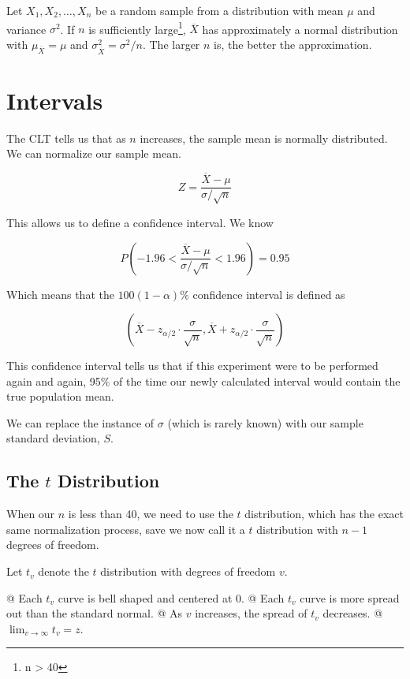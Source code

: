 Let $X_1, X_2, \ldots, X_n$ be a random sample from a distribution with mean $\mu$ and variance $\sigma^2$. If $n$ is
sufficiently large\footnote{n > 40}, $\overline{X}$ has approximately a normal distribution with $\mu_{\overline{X} } = \mu$ and
$\sigma^2_{\overline{X} } = \sigma^2 / n$. The larger $n$ is, the better the approximation.

\section{Intervals}
The CLT tells us that as $n$ increases, the sample mean is normally distributed. We can normalize our sample mean.

\[
    Z = \frac{\overline{X} - \mu}{\sigma / \sqrt{n} }
\]

This allows us to define a confidence interval. We know 

\[
    P \left( -1.96 < \frac{\overline{X} - \mu}{\sigma / \sqrt{n} } < 1.96 \right) = 0.95
\]

Which means that the $100 ( 1 - \alpha)\%$ confidence interval is defined as

\[
    \left(
    \overline{X} - z_{\alpha/2} \cdot \frac{\sigma}{\sqrt{n} },
    \overline{X} + z_{\alpha/2} \cdot \frac{\sigma}{\sqrt{n} }
    \right)
\]

This confidence interval tells us that if this experiment were to be performed again and again, 95\% of the time our
newly calculated interval would contain the true population mean.

We can replace the instance of $\sigma$ (which is rarely known) with our sample standard deviation, $S$.

    \subsection{The $t$ Distribution}
    When our $n$ is less than 40, we need to use the $t$ distribution, which has the exact same normalization process,
    save we now call it a $t$ distribution with $n - 1$ degrees of freedom.

    Let $t_v$ denote the $t$ distribution with degrees of freedom $v$.

    \NewList
    \begin{easylist}
        @ Each $t_v$ curve is bell shaped and centered at 0.
        @ Each $t_v$ curve is more spread out than the standard normal.
        @ As $v$ increases, the spread of $t_v$ decreases.
        @ $ \lim_{v \to \infty} t_v = z$.
    \end{easylist}

